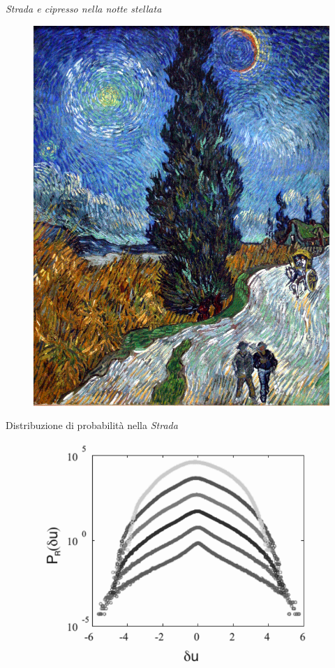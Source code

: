 \documentclass[11pt]{beamer}
\begin{document}
\begin{frame}{\emph{Strada e cipresso nella notte stellata}}
\begin{figure}
\centering
\includegraphics[scale=0.08]{road_cypress.jpg}
\end{figure}
\end{frame}

\begin{frame}{Distribuzione di probabilità nella \emph{Strada}}
\begin{figure}
\centering
\includegraphics[scale=0.35]{PDF_road.png}
\end{figure}
\end{frame}
\end{document}
